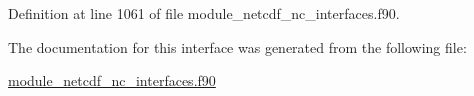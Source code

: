 Definition at line 1061 of file module\+\_\+netcdf\+\_\+nc\+\_\+interfaces.\+f90.



The documentation for this interface was generated from the following file\+:\begin{DoxyCompactItemize}
\item 
\hyperlink{module__netcdf__nc__interfaces_8f90}{module\+\_\+netcdf\+\_\+nc\+\_\+interfaces.\+f90}\end{DoxyCompactItemize}
